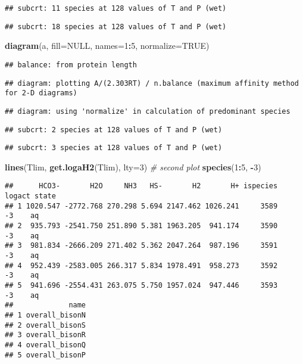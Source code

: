\documentclass[]{article}
\newenvironment{Shaded}{\begin{snugshade}}{\end{snugshade}}
\newcommand{\KeywordTok}[1]{\textcolor[rgb]{0.13,0.29,0.53}{\textbf{#1}}}
\newcommand{\DataTypeTok}[1]{\textcolor[rgb]{0.13,0.29,0.53}{#1}}
\newcommand{\DecValTok}[1]{\textcolor[rgb]{0.00,0.00,0.81}{#1}}
\newcommand{\CommentTok}[1]{\textcolor[rgb]{0.56,0.35,0.01}{\textit{#1}}}
\newcommand{\OtherTok}[1]{\textcolor[rgb]{0.56,0.35,0.01}{#1}}
\newcommand{\OperatorTok}[1]{\textcolor[rgb]{0.81,0.36,0.00}{\textbf{#1}}}
\newcommand{\NormalTok}[1]{#1}
\begin{document}
\begin{verbatim}
## subcrt: 11 species at 128 values of T and P (wet)
\end{verbatim}

\begin{verbatim}
## subcrt: 18 species at 128 values of T and P (wet)
\end{verbatim}

\begin{Shaded}
\begin{Highlighting}[]
\KeywordTok{diagram}\NormalTok{(a, }\DataTypeTok{fill=}\OtherTok{NULL}\NormalTok{, }\DataTypeTok{names=}\DecValTok{1}\OperatorTok{:}\DecValTok{5}\NormalTok{, }\DataTypeTok{normalize=}\OtherTok{TRUE}\NormalTok{)}
\end{Highlighting}
\end{Shaded}

\begin{verbatim}
## balance: from protein length
\end{verbatim}

\begin{verbatim}
## diagram: plotting A/(2.303RT) / n.balance (maximum affinity method for 2-D diagrams)
\end{verbatim}

\begin{verbatim}
## diagram: using 'normalize' in calculation of predominant species
\end{verbatim}

\begin{verbatim}
## subcrt: 2 species at 128 values of T and P (wet)
\end{verbatim}

\begin{verbatim}
## subcrt: 3 species at 128 values of T and P (wet)
\end{verbatim}

\begin{Shaded}
\begin{Highlighting}[]
\KeywordTok{lines}\NormalTok{(Tlim, }\KeywordTok{get.logaH2}\NormalTok{(Tlim), }\DataTypeTok{lty=}\DecValTok{3}\NormalTok{)}
\CommentTok{# second plot}
\KeywordTok{species}\NormalTok{(}\DecValTok{1}\OperatorTok{:}\DecValTok{5}\NormalTok{, }\OperatorTok{-}\DecValTok{3}\NormalTok{)}
\end{Highlighting}
\end{Shaded}

\begin{verbatim}
##      HCO3-       H2O     NH3   HS-       H2       H+ ispecies logact state
## 1 1020.547 -2772.768 270.298 5.694 2147.462 1026.241     3589     -3    aq
## 2  935.793 -2541.750 251.890 5.381 1963.205  941.174     3590     -3    aq
## 3  981.834 -2666.209 271.402 5.362 2047.264  987.196     3591     -3    aq
## 4  952.439 -2583.005 266.317 5.834 1978.491  958.273     3592     -3    aq
## 5  941.696 -2554.431 263.075 5.750 1957.024  947.446     3593     -3    aq
##             name
## 1 overall_bisonN
## 2 overall_bisonS
## 3 overall_bisonR
## 4 overall_bisonQ
## 5 overall_bisonP
\end{verbatim}
\end{document}
